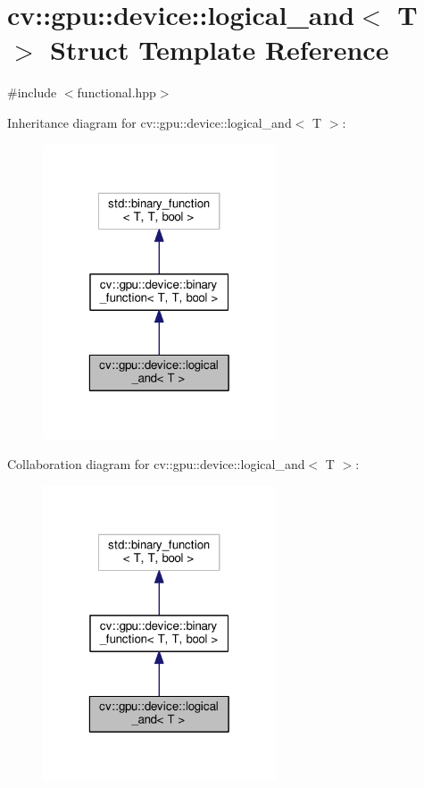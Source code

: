 \hypertarget{structcv_1_1gpu_1_1device_1_1logical__and}{\section{cv\-:\-:gpu\-:\-:device\-:\-:logical\-\_\-and$<$ T $>$ Struct Template Reference}
\label{structcv_1_1gpu_1_1device_1_1logical__and}
}


{\ttfamily \#include $<$functional.\-hpp$>$}



Inheritance diagram for cv\-:\-:gpu\-:\-:device\-:\-:logical\-\_\-and$<$ T $>$\-:\nopagebreak
\begin{figure}[H]
\begin{center}
\leavevmode
\includegraphics[width=196pt]{structcv_1_1gpu_1_1device_1_1logical__and__inherit__graph}
\end{center}
\end{figure}


Collaboration diagram for cv\-:\-:gpu\-:\-:device\-:\-:logical\-\_\-and$<$ T $>$\-:\nopagebreak
\begin{figure}[H]
\begin{center}
\leavevmode
\includegraphics[width=196pt]{structcv_1_1gpu_1_1device_1_1logical__and__coll__graph}
\end{center}
\end{figure}

